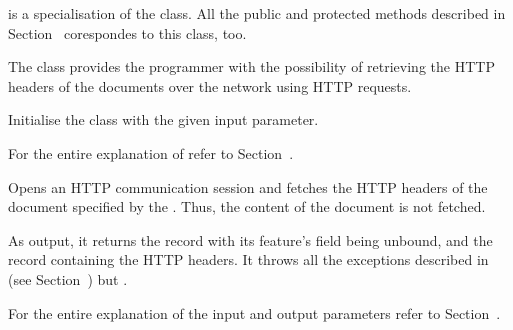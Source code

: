\documentclass{ozdoc}
\begin{document}



 is a specialisation of the  class. All the public and protected methods described in Section~ corespondes to this class, too.

The  class provides the programmer with the possibility of retrieving the HTTP headers of the documents over the network using  HTTP requests. \mozartEMPTY
 \mozartEMPTY
\begin{mozartDESCRIPTION}
\mozartENTRYHASCODE
\begin{mozartSYNOPSIS}
\begin{mozartCODEDISPLAY}\mozartFACETEXT{)}\end{mozartCODEDISPLAY}
\end{mozartSYNOPSIS}
\mozartITEM Initialise the class with the given  input parameter.

  \mozartEMPTY
For the entire explanation of  refer to Section~. \mozartEMPTY
{}\mozartENTRYHASCODE
\begin{mozartSYNOPSIS}
\begin{mozartCODEDISPLAY}\mozartFACETEXT{\mozartSPACE{}}\mozartFACETEXT{\mozartSPACE{}}\mozartFACETEXT{)}\end{mozartCODEDISPLAY}
\end{mozartSYNOPSIS}
\mozartITEM Opens an HTTP communication session and fetches the HTTP headers of the document specified by the . Thus, the content of the document is not fetched.

As output, it returns the  record with its  feature's field being unbound, and the  record containing the HTTP headers. It throws all the exceptions described in (see Section~) but .  

For the entire explanation of the input and output parameters refer to Section~. \mozartEMPTY
\end{mozartDESCRIPTION}
\end{document}
